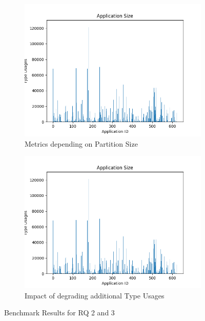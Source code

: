 \begin{figure}[t]
    \centering
    \begin{subfigure}[h]{0.49\textwidth}
        \centering
        \includegraphics[width=1.1\textwidth]{figures/graph_partition}
        \caption{Metrics depending on Partition Size}
        \label{fig:partition}
    \end{subfigure}
    \begin{subfigure}[h]{0.49\textwidth}
        \centering
        \includegraphics[width=1.1\textwidth]{figures/graph_robustness}
        \caption{Impact of degrading additional Type Usages}
        \label{fig:robustness}
    \end{subfigure}
    \caption{Benchmark Results for RQ 2 and 3}
\end{figure}


